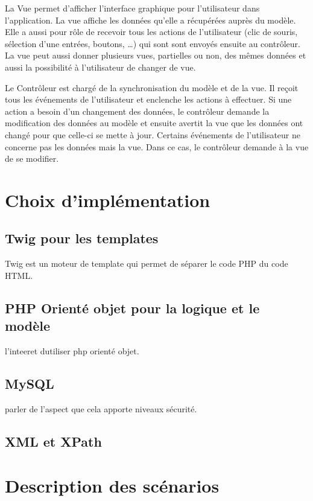 \documentclass[a4paper,10pt]{report}
\begin{document}
La Vue permet d'afficher l'interface graphique pour l'utilisateur dans l'application.
La vue affiche les données qu'elle a récupérées auprès du modèle. Elle a aussi pour rôle de recevoir tous les actions de l'utilisateur (clic de souris, sélection d'une entrées, boutons, …) qui sont sont envoyés ensuite au contrôleur.
La vue peut aussi donner plusieurs vues, partielles ou non, des mêmes données et aussi la possibilité à l'utilisateur de changer de vue.


Le Contrôleur est chargé de la synchronisation du modèle et de la vue. Il reçoit tous les événements de l'utilisateur et enclenche les actions à effectuer. Si une action a besoin d'un changement des données, le contrôleur demande la modification des données au modèle et ensuite avertit la vue que les données ont changé pour que celle-ci se mette à jour. Certains événements de l'utilisateur ne concerne pas les données mais la vue. Dans ce cas, le contrôleur demande à la vue de se modifier.



\chapter{Choix d'implémentation}

\section{Twig pour les templates }

Twig est un moteur de template qui permet de séparer le code PHP du code HTML.


\section{PHP Orienté objet pour la logique et le modèle}

l'inteeret dutiliser php orienté objet.

\section{MySQL }

parler de l'aspect que cela apporte niveaux sécurité.

\section{XML et XPath}

\chapter{Description des scénarios}
\end{document}
